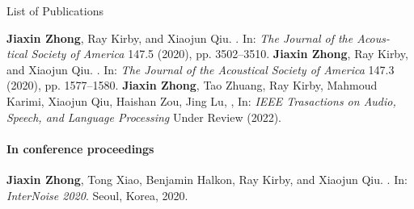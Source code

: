 \documentclass[
    11pt, %
    english, %
    onehalfspacing, %
    headsepline, %
]{MastersDoctoralThesis} %
\begin{document}
\begin{frontmatterpage}{List of Publications}
\begin{outline}[enumerate]
        \1 \textbf{Jiaxin Zhong}, Ray Kirby, and Xiaojun Qiu. . In: \textit{The Journal of the Acous- tical Society of America} 147.5 (2020), pp. 3502--3510.
        \1 \textbf{Jiaxin Zhong}, Ray Kirby, and Xiaojun Qiu. . In: \textit{The Journal of the Acoustical Society of America} 147.3 (2020), pp. 1577--1580.
        \1 \textbf{Jiaxin Zhong}, Tao Zhuang, Ray Kirby, Mahmoud Karimi, Xiaojun Qiu, Haishan Zou, Jing Lu, , In: \textit{IEEE Trasactions on Audio, Speech, and Language Processing} Under Review (2022).
    \end{outline}
    \noindent \paragraph{In conference proceedings}
    \begin{outline}[enumerate]
        \1 \textbf{Jiaxin Zhong}, Tong Xiao, Benjamin Halkon, Ray Kirby, and Xiaojun Qiu. . In: \textit{InterNoise 2020}. Seoul, Korea, 2020.
    \end{outline}


\end{frontmatterpage}
\end{document}
